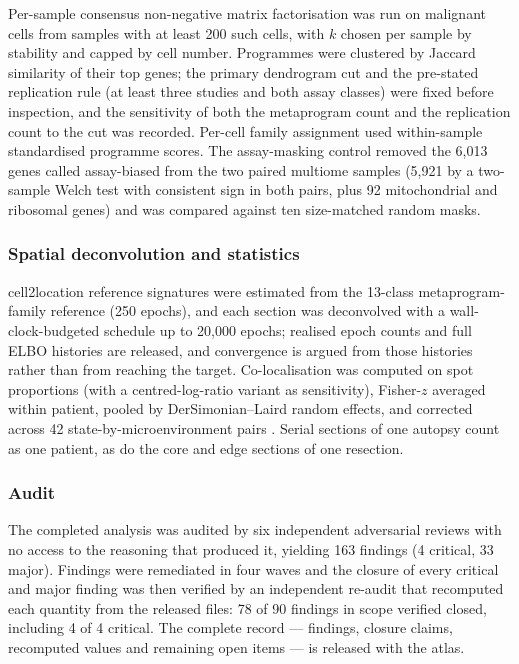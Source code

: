\documentclass[12pt,a4paper]{article}
\begin{document}
Per-sample consensus non-negative matrix factorisation \citep{kotliar2019identifying} was run on malignant cells from
samples with at least 200 such cells, with $k$ chosen per sample by stability and capped by cell number. Programmes
were clustered by Jaccard similarity of their top genes; the primary dendrogram cut and the pre-stated replication rule
(at least three studies and both assay classes) were fixed before inspection, and the sensitivity of both the
metaprogram count and the replication count to the cut was recorded. Per-cell family assignment used within-sample
standardised programme scores. The assay-masking control removed the 6,013 genes called assay-biased from the two
paired multiome samples (5,921 by a two-sample Welch test with consistent sign in both pairs, plus 92 mitochondrial and
ribosomal genes) and was compared against ten size-matched random masks.

\subsubsection{Spatial deconvolution and statistics}

cell2location \citep{kleshchevnikov2022celllocation} reference signatures were estimated from the 13-class
metaprogram-family reference (250 epochs), and each section was deconvolved with a wall-clock-budgeted schedule up to
20,000 epochs; realised epoch counts and full ELBO histories are released, and convergence is argued from those
histories rather than from reaching the target. Co-localisation was computed on spot proportions (with a
centred-log-ratio variant as sensitivity), Fisher-$z$ averaged within patient, pooled by DerSimonian--Laird random
effects, and corrected across 42 state-by-microenvironment pairs \citep{benjamini1995controlling}. Serial sections of
one autopsy count as one patient, as do the core and edge sections of one resection.

\subsubsection{Audit}

The completed analysis was audited by six independent adversarial reviews with no access to the reasoning that produced
it, yielding 163 findings (4 critical, 33 major). Findings were remediated in four waves and the closure of every
critical and major finding was then verified by an independent re-audit that recomputed each quantity from the released
files: 78 of 90 findings in scope verified closed, including 4 of 4 critical. The complete record --- findings, closure
claims, recomputed values and remaining open items --- is released with the atlas.
\end{document}
